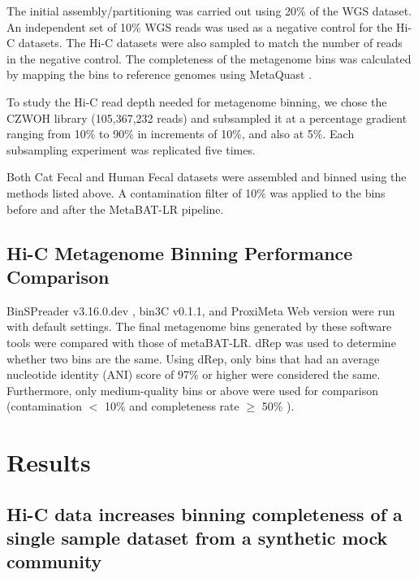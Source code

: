 \documentclass[fleqn,10pt,lineno]{wlpeerj}
\begin{document}
The initial assembly/partitioning was carried out using 20\% of the WGS dataset. An independent set of 10\%  WGS reads was used as a negative control for the Hi-C datasets. The Hi-C datasets were also sampled to match the number of reads in the negative control. The completeness of the metagenome bins was calculated by mapping the bins to reference genomes using MetaQuast \citep{mikheenko2016metaquast}.


To study the Hi-C read depth needed for metagenome binning, we chose the CZWOH library (105,367,232 reads) and subsampled it at a percentage gradient ranging from 10\% to 90\% in increments of 10\%, and also at 5\%. Each subsampling experiment was replicated five times.      

Both Cat Fecal and Human Fecal datasets were assembled and binned using the methods listed above. A contamination filter of 10\% was applied to the bins before and after the MetaBAT-LR pipeline. 

\subsection*{Hi-C Metagenome Binning Performance Comparison}

BinSPreader v3.16.0.dev \citep{tolstoganov2022binspreader}, bin3C v0.1.1\citep{demaere2019bin3c}, and ProxiMeta Web version \citep{press2017hi} were run with default settings. The final metagenome bins generated by these software tools were compared with those of metaBAT-LR. dRep was used to determine whether two bins are the same. Using dRep, only bins that had an average nucleotide identity (ANI) score of 97\% or higher were considered the same. Furthermore, only medium-quality bins or above were used for comparison (contamination $<$ 10\% and completeness rate $\ge$ 50\% \citep{bowers2017minimum}).    

\section*{Results}

\subsection*{Hi-C data increases binning completeness of a single sample dataset from a synthetic mock community}
\end{document}
